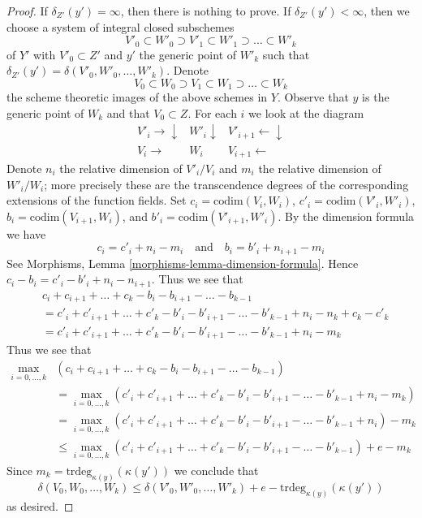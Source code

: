 \begin{proof}
If $\delta_{Z'}(y') = \infty$, then there is nothing to prove.
If $\delta_{Z'}(y') < \infty$, then we choose a system
of integral closed subschemes
$$
V'_0 \subset W'_0 \supset V'_1 \subset W'_1 \supset \ldots \subset W'_k
$$
of $Y'$ with $V'_0 \subset Z'$ and $y'$ the generic point of $W'_k$
such that $\delta_{Z'}(y') = \delta(V'_0, W'_0, \ldots, W'_k)$.
Denote
$$
V_0 \subset W_0 \supset V_1 \subset W_1 \supset \ldots \subset W_k
$$
the scheme theoretic images of the above schemes in $Y$. Observe
that $y$ is the generic point of $W_k$ and that $V_0 \subset Z$.
For each $i$ we look at the diagram
$$
\begin{array}{ccc}V'_i \longrightarrow\downarrow & W'_i \downarrow & V'_{i + 1} \longleftarrow\downarrow \\ V_i \longrightarrow & W_i & V_{i + 1} \longleftarrow\end{array}
$$
Denote $n_i$ the relative dimension of $V'_i/V_i$ and
$m_i$ the relative dimension of $W'_i/W_i$; more precisely
these are the transcendence degrees of the corresponding extensions of
the function fields. Set
$c_i = \text{codim}(V_i, W_i)$,
$c'_i = \text{codim}(V'_i, W'_i)$,
$b_i = \text{codim}(V_{i + 1}, W_i)$, and
$b'_i = \text{codim}(V'_{i + 1}, W'_i)$.
By the dimension formula we have
$$
c_i = c'_i + n_i - m_i
\quad\text{and}\quad
b_i = b'_i + n_{i + 1} - m_i
$$
See Morphisms, Lemma \ref{morphisms-lemma-dimension-formula}.
Hence $c_i - b_i = c'_i - b'_i + n_i - n_{i + 1}$. Thus we see that
\begin{align*}
& c_i + c_{i + 1} + \ldots + c_k - b_i - b_{i + 1} - \ldots - b_{k - 1} \\
& =
c'_i + c'_{i + 1} + \ldots + c'_k - b'_i - b'_{i + 1} - \ldots - b'_{k - 1}
+ n_i - n_k + c_k - c'_k \\
& =
c'_i + c'_{i + 1} + \ldots + c'_k - b'_i - b'_{i + 1} - \ldots - b'_{k - 1}
+ n_i - m_k
\end{align*}
Thus we see that
\begin{align*}
\max_{i = 0, \ldots, k}
& (c_i + c_{i + 1} + \ldots + c_k - b_i - b_{i + 1} - \ldots - b_{k - 1}) \\
& =
\max_{i = 0, \ldots, k}
(c'_i + c'_{i + 1} + \ldots + c'_k - b'_i - b'_{i + 1} - \ldots - b'_{k - 1}
+ n_i - m_k) \\
& =
\max_{i = 0, \ldots, k}
(c'_i + c'_{i + 1} + \ldots + c'_k - b'_i - b'_{i + 1} - \ldots - b'_{k - 1}
+ n_i) - m_k \\
& \leq
\max_{i = 0, \ldots, k}
(c'_i + c'_{i + 1} + \ldots + c'_k - b'_i - b'_{i + 1} - \ldots - b'_{k - 1})
+ e - m_k
\end{align*}
Since $m_k = \text{trdeg}_{\kappa(y)}(\kappa(y'))$ we conclude that
$$
\delta(V_0, W_0, \ldots, W_k) \leq
\delta(V'_0, W'_0, \ldots, W'_k) + e - \text{trdeg}_{\kappa(y)}(\kappa(y'))
$$
as desired.
\end{proof}

